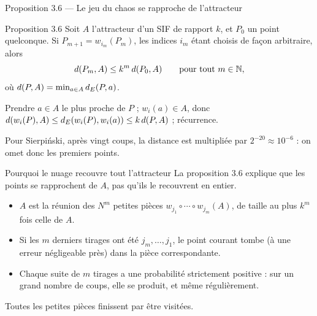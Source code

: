 \begin{frame}{Proposition 3.6 --- Le jeu du chaos se rapproche de l'attracteur}
  \begin{Enonce}{Proposition 3.6}
    \small Soit $A$ l'attracteur d'un SIF de rapport $k$, et $P_0$ un
    point quelconque. Si $P_{m+1}=w_{i_m}(P_m)$, les indices $i_m$ étant
    choisis de façon arbitraire, alors
    \[
      d(P_m,A)\leq k^m\,d(P_0,A)\qquad\text{pour tout } m\in\operatorname{\mathbb{N}},
    \]
    où $d(P,A)=\min_{a\in A}d_E(P,a)$.
  \end{Enonce}
  \begin{AuTableau}
    \footnotesize Prendre $a\in A$ le plus proche de $P$ ; $w_i(a)\in A$,
    donc $d(w_i(P),A)\leq d_E(w_i(P),w_i(a))\leq k\,d(P,A)$ ; récurrence.
  \end{AuTableau}
  \small Pour Sierpiński, après vingt coups, la distance est multipliée
  par $2^{-20}\approx10^{-6}$ : on omet donc les premiers points.
\end{frame}

\begin{frame}{Pourquoi le nuage recouvre tout l'attracteur}
  \small La proposition 3.6 explique que les points se rapprochent de
  $A$, pas qu'ils le recouvrent en entier.
  \begin{itemize}
    \item $A$ est la réunion des $N^m$ petites pièces
      $w_{j_1}\circ\cdots\circ w_{j_m}(A)$, de taille au plus $k^m$ fois
      celle de $A$.
    \item Si les $m$ derniers tirages ont été $j_m,\dots,j_1$, le point
      courant tombe (à une erreur négligeable près) dans la pièce
      correspondante.
    \item Chaque suite de $m$ tirages a une probabilité strictement
      positive : sur un grand nombre de coups, elle se produit, et même
      régulièrement.
  \end{itemize}
  Toutes les petites pièces finissent par être visitées.
\end{frame}

